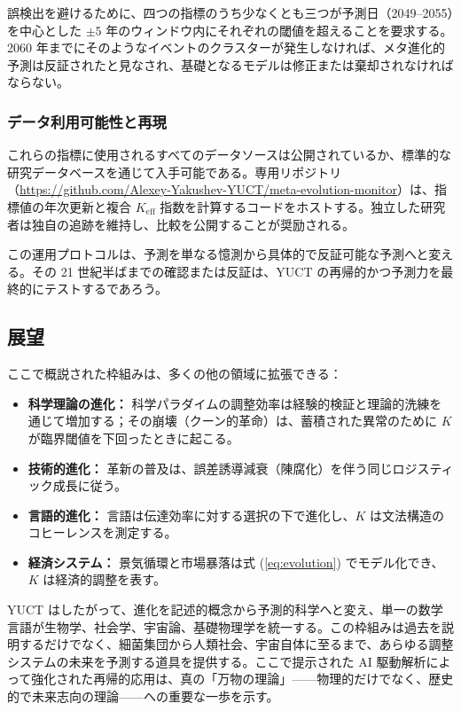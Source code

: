 \documentclass[12pt,a4paper]{article}
\theoremstyle{remark}
\begin{document}
	誤検出を避けるために、四つの指標のうち少なくとも三つが予測日（2049–2055）を中心とした \(\pm 5\) 年のウィンドウ内にそれぞれの閾値を超えることを要求する。2060 年までにそのようなイベントのクラスターが発生しなければ、メタ進化的予測は反証されたと見なされ、基礎となるモデルは修正または棄却されなければならない。
	
	\subsubsection{データ利用可能性と再現}
	
	これらの指標に使用されるすべてのデータソースは公開されているか、標準的な研究データベースを通じて入手可能である。専用リポジトリ（\url{https://github.com/Alexey-Yakushev-YUCT/meta-evolution-monitor}）は、指標値の年次更新と複合 \(K_{\text{eff}}\) 指数を計算するコードをホストする。独立した研究者は独自の追跡を維持し、比較を公開することが奨励される。
	
	この運用プロトコルは、予測を単なる憶測から具体的で反証可能な予測へと変える。その 21 世紀半ばまでの確認または反証は、YUCT の再帰的かつ予測力を最終的にテストするであろう。
	
	\subsection*{展望}
	
	ここで概説された枠組みは、多くの他の領域に拡張できる：
	\begin{itemize}
		\item \textbf{科学理論の進化：} 科学パラダイムの調整効率は経験的検証と理論的洗練を通じて増加する；その崩壊（クーン的革命）は、蓄積された異常のために \(K\) が臨界閾値を下回ったときに起こる。
		\item \textbf{技術的進化：} 革新の普及は、誤差誘導減衰（陳腐化）を伴う同じロジスティック成長に従う。
		\item \textbf{言語的進化：} 言語は伝達効率に対する選択の下で進化し、\(K\) は文法構造のコヒーレンスを測定する。
		\item \textbf{経済システム：} 景気循環と市場暴落は式 (\ref{eq:evolution}) でモデル化でき、\(K\) は経済的調整を表す。
	\end{itemize}
	
	YUCT はしたがって、進化を記述的概念から予測的科学へと変え、単一の数学言語が生物学、社会学、宇宙論、基礎物理学を統一する。この枠組みは過去を説明するだけでなく、細菌集団から人類社会、宇宙自体に至るまで、あらゆる調整システムの未来を予測する道具を提供する。ここで提示された AI 駆動解析によって強化された再帰的応用は、真の「万物の理論」——物理的だけでなく、歴史的で未来志向の理論——への重要な一歩を示す。
	
\end{document}
